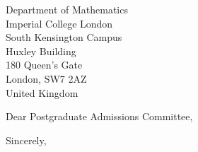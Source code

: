 \documentclass[12pt]{dutletter_en}
\date{\vspace{10mm} \today}
\makeatletter
\def\Where{%
    \textbf{\color{dutblue}Leicester International Institute, \\
    Dalian University of Technology}
}
\def\Address{
    No.2 Dagong Road,\\
    Dawa District,
}
\def\Campus{\textbf{\color{dutblue}Panjin Campus}}
\def\CityZip{Panjin, Liaoning, China 116024}
\def\Office{\textbf{\color{dutblue}Office}: C08-306-2}
\def\Email{\textbf{\color{dutblue}E-mail}: \href{mailto:example@dlut.edu.cn}{example@dlut.edu.cn}}
\def\URL{\textbf{\color{dutblue}URL}: \\\href{https://faculty.dlut.edu.cn/example}{https://faculty.dlut.edu.cn/}}
\def\newaddress{%
    \Where\\
    \Campus\\
    \Address\\
    \CityZip\\
    \Office\\
    \Email\\
    \URL
}
\makeatother
\begin{document}
\begin{letter}{Department of Mathematics \\
    Imperial College London \\
    South Kensington Campus \\
    Huxley Building \\
    180 Queen's Gate \\
    London, SW7 2AZ \\
    United Kingdom
    }


\opening{Dear Postgraduate Admissions Committee,}


\lipsum[1-2]



\closing{Sincerely,}

\end{letter}
\end{document}
